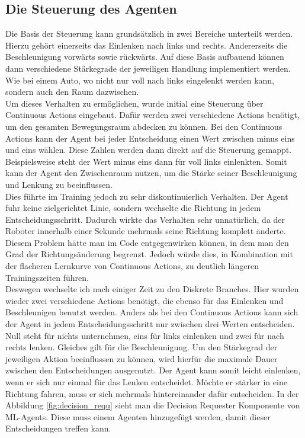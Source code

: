 \subsection{Die Steuerung des Agenten}
Die Basis der Steuerung kann grundsätzlich in zwei Bereiche unterteilt werden. Hierzu gehört einerseits das Einlenken nach links und rechts. Andererseits die Beschleunigung vorwärts sowie rückwärts. Auf diese Basis aufbauend können dann verschiedene Stärkegrade der jeweiligen Handlung implementiert werden. Wie bei einem Auto, wo nicht nur voll nach links eingelenkt werden kann, sondern auch den Raum dazwischen. 
\\
Um dieses Verhalten zu ermöglichen, wurde initial eine Steuerung über Continuous Actions eingebaut. Dafür werden zwei verschiedene Actions benötigt, um den gesamten Bewegungsraum abdecken zu können. Bei den Continuous Actions kann der Agent bei jeder Entscheidung einen Wert zwischen minus eins und eins wählen. Diese Zahlen werden dann direkt auf die Steuerung gemappt. Beispielsweise steht der Wert minus eins dann für voll links einlenkten. Somit kann der Agent den Zwischenraum nutzen, um die Stärke seiner Beschleunigung und Lenkung zu beeinflussen. 
\\
Dies führte im Training jedoch zu sehr diskontinuierlich Verhalten. Der Agent fuhr keine zielgerichtet Linie, sondern wechselte die Richtung in jedem Entscheidungsschritt. Dadurch wirkte das Verhalten sehr unnatürlich, da der Roboter innerhalb einer Sekunde mehrmals seine Richtung komplett änderte. Diesem Problem hätte man im Code entgegenwirken können, in dem man den Grad der Richtungsänderung begrenzt. Jedoch würde dies, in Kombination mit der flacheren Lernkurve von Continuous Actions, zu deutlich längeren Trainingszeiten führen.
\\
Deswegen wechselte ich nach einiger Zeit zu den Diskrete Branches. Hier wurden wieder zwei verschiedene Actions benötigt, die ebenso für das Einlenken und Beschleunigen benutzt werden. Anders als bei den Continuous Actions kann sich der Agent in jedem Entscheidungsschritt nur zwischen drei Werten entscheiden. Null steht für nichts unternehmen, eins für links einlenken und zwei für nach rechts lenken. Gleiches gilt für die Beschleunigung. Um den Stärkegrad der jeweiligen Aktion beeinflussen zu können, wird hierfür die maximale Dauer zwischen den Entscheidungen ausgenutzt. Der Agent kann somit leicht einlenken, wenn er sich nur einmal für das Lenken entscheidet. Möchte er stärker in eine Richtung fahren, muss er sich mehrmals hintereinander dafür entscheiden. In der Abbildung \ref{fig:decision_requ} sieht man die Decision Requester Komponente von ML-Agents. Diese muss einem Agenten hinzugefügt werden, damit dieser Entscheidungen treffen kann. 
